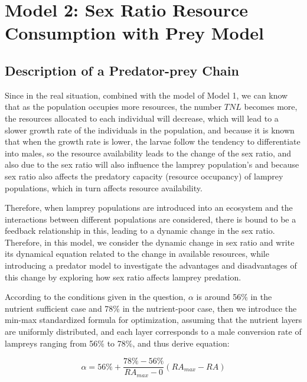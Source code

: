 \documentclass[12pt]{article}  %
\begin{document}
\section{Model 2: Sex Ratio Resource Consumption with Prey Model}
\subsection{Description of a Predator-prey Chain}
Since in the real situation, combined with the model of Model 1, we can know that as the population occupies more resources, the number $TNL$ becomes more, the resources allocated to each individual will decrease, which will lead to a slower growth rate of the individuals in the population, and because it is known that when the growth rate is lower, the larvae follow the tendency to differentiate into males, so the resource availability leads to the change of the sex ratio, and also due to the sex ratio will also influence the lamprey population's and because sex ratio also affects the predatory capacity (resource occupancy) of lamprey populations, which in turn affects resource availability\cite{8}. 

Therefore, when lamprey populations are introduced into an ecosystem and the interactions between different populations are considered, there is bound to be a feedback relationship in this, leading to a dynamic change in the sex ratio. Therefore, in this model, we consider the dynamic change in sex ratio and write its dynamical equation related to the change in available resources, while introducing a predator model to investigate the advantages and disadvantages of this change by exploring how sex ratio affects lamprey predation.

According to the conditions given in the question, $\alpha$ is around 56\% in the nutrient sufficient case and 78\% in the nutrient-poor case, then we introduce the min-max standardized formula for optimization, assuming that the nutrient layers are uniformly distributed, and each layer corresponds to a male conversion rate of lampreys ranging from
56\% to 78\%, and thus derive equation:

\begin{equation}\label{eq:5-1}
	\alpha = 56\% + \frac{78\%-56\%}{{RA}_{max}-0}({RA}_{max}-RA)
\end{equation}
\end{document}
